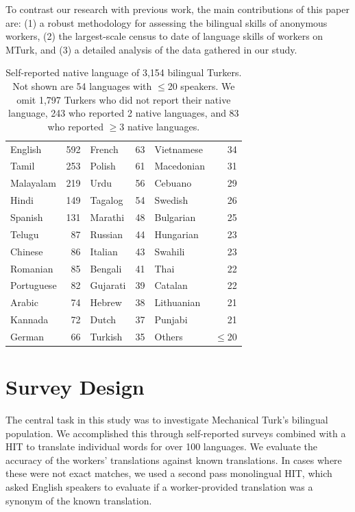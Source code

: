 \documentclass[11pt]{article}
\begin{document}
To contrast our research with previous work, the main contributions of this paper are: (1) a robust methodology for assessing the bilingual  skills of anonymous workers, (2) the largest-scale census to date of language skills of workers on MTurk, and (3) a detailed analysis of the data gathered in our study.

\begin{table}
\footnotesize
\begin{tabular}{lrlrlr}\hline\hline
\hline
English&592&	French&63&	Vietnamese&34\\
Tamil&253&	Polish&61&	Macedonian&31\\
Malayalam&219&	Urdu&56&	Cebuano&29\\
Hindi&149&	Tagalog&54&	Swedish&26\\
Spanish&131&	Marathi&48&	Bulgarian&25\\
Telugu&87&	Russian&44&	Hungarian&23\\
Chinese&86&	Italian&43&	Swahili&23\\
Romanian&85&	Bengali&41&	Thai&22\\
Portuguese&82&	Gujarati&39&	Catalan&22\\
Arabic&74&	Hebrew&38&	Lithuanian&21\\
Kannada&72&	Dutch&37&	Punjabi&21\\
German&66&	Turkish&35&	Others &$\leq$20\\
\hline\hline
\end{tabular}
\normalsize
\caption{Self-reported native language of 3,154 bilingual Turkers. Not shown are 54 languages with $\leq$20 speakers. 
We omit 1,797 Turkers who did not report their native language, 243 who reported 2 native languages, and 83 who reported $\geq$3 native languages.}\label{lang-pie}
\end{table}

\section{Survey Design}
The central task in this study was to investigate Mechanical Turk's bilingual population.  We accomplished this through self-reported surveys combined with a HIT to translate individual words for over 100 languages.  We evaluate the accuracy of the workers' translations against known translations.  In cases where these were not exact matches, we used a second pass monolingual HIT, which asked English speakers to evaluate if a worker-provided translation was a synonym of the known translation.
\end{document}
